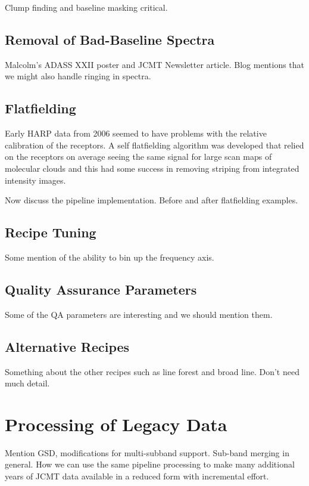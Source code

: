 \documentclass[final,authoryear,5p,times,twocolumn]{elsarticle}
\begin{document}
Clump finding and baseline masking critical.

\subsection{Removal of Bad-Baseline Spectra}

Malcolm's ADASS XXII poster and JCMT Newsletter article. Blog mentions
that we might also handle ringing in spectra.

\subsection{Flatfielding}

Early HARP data from 2006 seemed to have problems with the relative
calibration of the receptors. A self flatfielding algorithm was
developed that relied on the receptors on average seeing the same
signal for large scan maps of molecular clouds
\citep{2010MNRAS.401..455C} and this had some success in removing
striping from integrated intensity images.

Now discuss the pipeline implementation. Before and after flatfielding examples.

\subsection{Recipe Tuning}

Some mention of the ability to bin up the frequency axis.

\subsection{Quality Assurance Parameters}

Some of the QA parameters are interesting and we should mention them.

\subsection{Alternative Recipes}

Something about the other recipes such as line forest and broad
line. Don't need much detail.

\section{Processing of Legacy Data}

Mention GSD, modifications for multi-subband support. Sub-band merging
in general. How we can use the same pipeline processing to make many
additional years of JCMT data available in a reduced form with
incremental effort.
\end{document}
